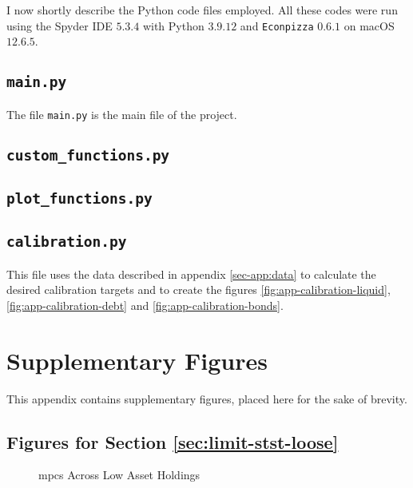 \documentclass[12pt]{article} %
\numberwithin{equation}{section} %
\numberwithin{figure}{section}
\numberwithin{table}{section}
\begin{document}
\begin{refsection}
\begin{appendices}
I now shortly describe the Python code files employed. All these codes were run using the Spyder IDE $5.3.4$ with Python $3.9.12$ and \texttt{Econpizza} $0.6.1$ on macOS $12.6.5$.

\subsection*{\texttt{main.py}}

The file \texttt{main.py} is the main file of the project.

\subsection*{\texttt{custom\_functions.py}}

\subsection*{\texttt{plot\_functions.py}}

\subsection*{\texttt{calibration.py}}

This file uses the data described in appendix \ref{sec-app:data} to calculate the desired calibration targets and to create the figures \ref{fig:app-calibration-liquid}, \ref{fig:app-calibration-debt} and \ref{fig:app-calibration-bonds}.

\thispagestyle{plain}
\section{Supplementary Figures}
\label{sec-app:figures}

This appendix contains supplementary figures, placed here for the sake of brevity.

\subsection{Figures for Section \ref{sec:limit-stst-loose}}
\label{sec-app:figures-limit-loose}

\begin{figure}[H]
    \centering
    \caption{\Gls{mpc}s Across Low Asset Holdings}
    \label{fig:baseline-limit-initial-mpcs}
    
\end{figure}


\end{appendices}
\end{refsection}
\end{document}
